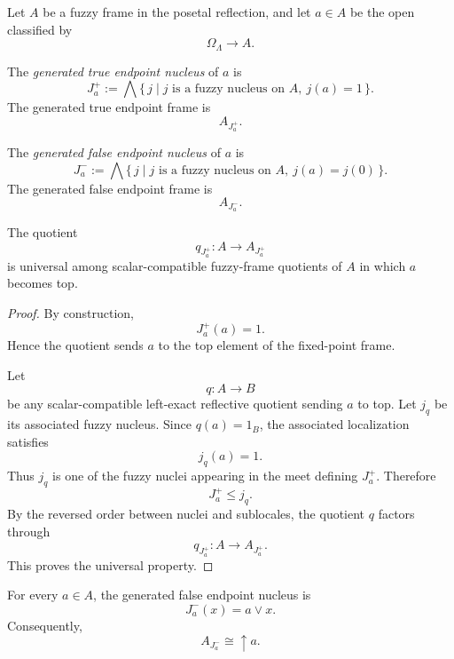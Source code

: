 Let \(A\) be a fuzzy frame in the posetal reflection, and let \(a\in A\) be the
open classified by
\[
    \Omega_\Lambda\to A.
\]

\begin{definition}
\label{def:generated-true-endpoint-nucleus}
The \emph{generated true endpoint nucleus} of \(a\) is
\[
    J_a^+
    :=
    \bigwedge
    \{\,j\mid j \text{ is a fuzzy nucleus on }A,\ j(a)=1\,\}.
\]
The generated true endpoint frame is
\[
    A_{J_a^+}.
\]
\end{definition}

\begin{definition}
\label{def:generated-false-endpoint-nucleus}
The \emph{generated false endpoint nucleus} of \(a\) is
\[
    J_a^-
    :=
    \bigwedge
    \{\,j\mid j \text{ is a fuzzy nucleus on }A,\ j(a)=j(0)\,\}.
\]
The generated false endpoint frame is
\[
    A_{J_a^-}.
\]
\end{definition}

\begin{proposition}
\label{prop:true-endpoint-nucleus-universal}
The quotient
\[
    q_{J_a^+}:A\to A_{J_a^+}
\]
is universal among scalar-compatible fuzzy-frame quotients of \(A\) in which
\(a\) becomes top.
\end{proposition}

\begin{proof}
By construction,
\[
    J_a^+(a)=1.
\]
Hence the quotient sends \(a\) to the top element of the fixed-point frame.

Let
\[
    q:A\to B
\]
be any scalar-compatible left-exact reflective quotient sending \(a\) to top.
Let \(j_q\) be its associated fuzzy nucleus.  Since \(q(a)=1_B\), the associated
localization satisfies
\[
    j_q(a)=1.
\]
Thus \(j_q\) is one of the fuzzy nuclei appearing in the meet defining
\(J_a^+\).  Therefore
\[
    J_a^+\leq j_q.
\]
By the reversed order between nuclei and sublocales, the quotient \(q\) factors
through
\[
    q_{J_a^+}:A\to A_{J_a^+}.
\]
This proves the universal property.
\end{proof}

\begin{theorem}
\label{thm:false-endpoint-nucleus-formula}
For every \(a\in A\), the generated false endpoint nucleus is
\[
    J_a^-(x)=a\vee x.
\]
Consequently,
\[
    A_{J_a^-}\cong\uparrow a.
\]
\end{theorem}

